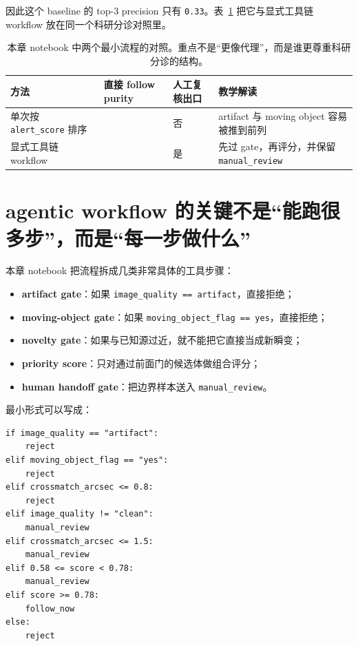 因此这个 baseline 的 top-3 precision 只有 \texttt{0.33}。表~\ref{tab:ch36_baseline_vs_agentic} 把它与显式工具链 workflow 放在同一个科研分诊对照里。

\begin{table}[htbp]
\centering
\small
\setlength{\tabcolsep}{4pt}
\begin{tabular}{@{}p{}>{\centering\arraybackslash}p{}>{\centering\arraybackslash}p{}p{}@{}}
\toprule
方法 & 直接 follow purity & 人工复核出口 & 教学解读 \\
\midrule
单次按 \texttt{alert\_score} 排序 & 0.33 & 否 & artifact 与 moving object 容易被推到前列 \\
显式工具链 workflow & 1.00 & 是 & 先过 gate，再评分，并保留 \texttt{manual\_review} \\
\bottomrule
\end{tabular}
\caption{本章 notebook 中两个最小流程的对照。重点不是“更像代理”，而是谁更尊重科研分诊的结构。}
\label{tab:ch36_baseline_vs_agentic}
\end{table}

\section{agentic workflow 的关键不是“能跑很多步”，而是“每一步做什么”}

本章 notebook 把流程拆成几类非常具体的工具步骤：

\begin{itemize}
    \item \textbf{artifact gate}：如果 \texttt{image\_quality == artifact}，直接拒绝；
    \item \textbf{moving-object gate}：如果 \texttt{moving\_object\_flag == yes}，直接拒绝；
    \item \textbf{novelty gate}：如果与已知源过近，就不能把它直接当成新瞬变；
    \item \textbf{priority score}：只对通过前面门的候选体做组合评分；
    \item \textbf{human handoff gate}：把边界样本送入 \texttt{manual\_review}。
\end{itemize}

最小形式可以写成：

\begin{examplebox}
\begin{lstlisting}[style=pythonstyle]
if image_quality == "artifact":
    reject
elif moving_object_flag == "yes":
    reject
elif crossmatch_arcsec <= 0.8:
    reject
elif image_quality != "clean":
    manual_review
elif crossmatch_arcsec <= 1.5:
    manual_review
elif 0.58 <= score < 0.78:
    manual_review
elif score >= 0.78:
    follow_now
else:
    reject
\end{lstlisting}
\end{examplebox}

